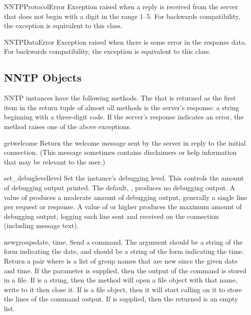 \begin{excdesc}{NNTPProtocolError}
Exception raised when a reply is received from the server that does
not begin with a digit in the range 1--5.  For backwards
compatibility, the exception  is equivalent to this
class.
\end{excdesc}

\begin{excdesc}{NNTPDataError}
Exception raised when there is some error in the response data.  For
backwards compatibility, the exception  is
equivalent to this class.
\end{excdesc}


\subsection{NNTP Objects \label{nntp-objects}}

NNTP instances have the following methods.  The  that is
returned as the first item in the return tuple of almost all methods
is the server's response: a string beginning with a three-digit code.
If the server's response indicates an error, the method raises one of
the above exceptions.


\begin{methoddesc}{getwelcome}{}
Return the welcome message sent by the server in reply to the initial
connection.  (This message sometimes contains disclaimers or help
information that may be relevant to the user.)
\end{methoddesc}

\begin{methoddesc}{set_debuglevel}{level}
Set the instance's debugging level.  This controls the amount of
debugging output printed.  The default, , produces no debugging
output.  A value of  produces a moderate amount of debugging
output, generally a single line per request or response.  A value of
 or higher produces the maximum amount of debugging output,
logging each line sent and received on the connection (including
message text).
\end{methoddesc}

\begin{methoddesc}{newgroups}{date, time, }
Send a  command.  The  argument should be a
string of the form  indicating the
date, and  should be a string of the form
 indicating the time.  Return a pair
 where  is a list of
group names that are new since the given date and time.
If the  parameter is supplied, then the output of the 
 command is stored in a file.  If  is a string, 
then the method will open a file object with that name, write to it 
then close it.  If  is a file object, then it will start
calling  on it to store the lines of the command output.
If  is supplied, then the returned  is an empty list.
\end{methoddesc}

